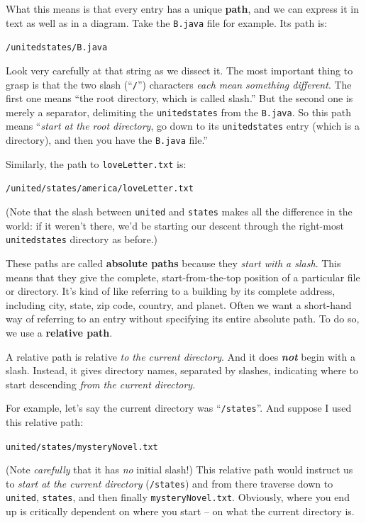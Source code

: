 What this means is that every entry has a unique \textbf{path}, and we can
express it in text as well as in a diagram. Take the \texttt{B.java} file for
example. Its path is:

\quad\quad \texttt{/unitedstates/B.java}

Look very carefully at that string as we dissect it. The most important thing
to grasp is that the two slash (``\texttt{/}'') characters \textit{each mean
something different}. The first one means ``the root directory, which is
called slash.'' But the second one is merely a separator, delimiting the
\texttt{unitedstates} from the \texttt{B.java}. So this path means
``\textit{start at the root directory}, go down to its \texttt{unitedstates}
entry (which is a directory), and then you have the \texttt{B.java} file.''

Similarly, the path to \texttt{loveLetter.txt} is:

\quad\quad \texttt{/united/states/america/loveLetter.txt}

(Note that the slash between \texttt{united} and \texttt{states} makes all the
difference in the world: if it weren't there, we'd be starting our descent
through the right-most \texttt{unitedstates} directory as before.)

These paths are called \textbf{absolute paths} because they \textit{start with
a slash}. This means that they give the complete, start-from-the-top position
of a particular file or directory. It's kind of like referring to a building
by its complete address, including city, state, zip code, country, and planet.
Often we want a short-hand way of referring to an entry without specifying its
entire absolute path. To do so, we use a \textbf{relative path}.

A relative path is relative \textit{to the current directory}. And it does
\textit{\textbf{not}} begin with a slash. Instead, it gives directory names,
separated by slashes, indicating where to start descending \textit{from the
current directory}.

For example, let's say the current directory was ``\texttt{/states}''. And
suppose I used this relative path:

\quad\quad \texttt{united/states/mysteryNovel.txt}

(Note \textit{carefully} that it has \textit{no} initial slash!) This relative
path would instruct us to \textit{start at the current directory}
(\texttt{/states}) and from there traverse down to \texttt{united},
\texttt{states}, and then finally \texttt{mysteryNovel.txt}. Obviously, where
you end up is critically dependent on where you start -- on what the current
directory is.

